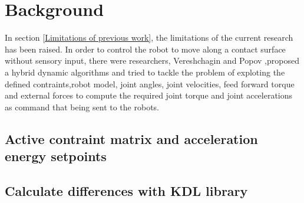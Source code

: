 \documentclass[report.tex]{subfiles}
\begin{document}
    \chapter{Background}
    In section \ref{Limitations of previous work}, the limitations of the current research has been raised. In order to control the robot to move along a contact surface without sensory input, there were researchers, Vereshchagin and Popov ,proposed a hybrid dynamic algorithms and tried to tackle the problem of exploting the defined contraints,robot model, joint angles, joint velocities, feed forward torque and external forces to compute the required joint torque and joint accelerations as command that being sent to the robots\cite{vereshchagin1989modeling}. 
    \section{Active contraint matrix and acceleration energy setpoints}
    \section{Calculate differences with KDL library}
\end{document}
